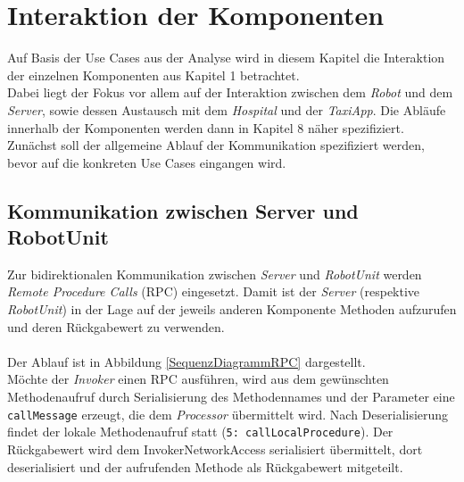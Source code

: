 \section{Interaktion der Komponenten}
Auf Basis der Use Cases aus der Analyse wird in diesem Kapitel die Interaktion der einzelnen Komponenten aus Kapitel 1 betrachtet. \\
Dabei liegt der Fokus vor allem auf der Interaktion zwischen dem \emph{Robot} und dem \emph{Server}, sowie dessen Austausch mit dem \emph{Hospital} und der \emph{TaxiApp}. 
Die Abläufe innerhalb der Komponenten werden dann in Kapitel 8 näher spezifiziert. \\
Zunächst soll der allgemeine Ablauf der Kommunikation spezifiziert werden, bevor auf die konkreten Use Cases eingangen wird.

\subsection*{Kommunikation zwischen Server und RobotUnit}
Zur bidirektionalen Kommunikation zwischen \emph{Server} und \emph{RobotUnit} werden \emph{Remote Procedure Calls} (RPC) eingesetzt. Damit ist der \emph{Server} (respektive \emph{RobotUnit}) in der Lage auf der jeweils anderen Komponente Methoden aufzurufen und deren Rückgabewert zu verwenden. \\ \\
Der Ablauf ist in Abbildung \ref{SequenzDiagrammRPC} dargestellt. \\ Möchte der \emph{Invoker} einen RPC ausführen, wird aus dem gewünschten Methodenaufruf durch Serialisierung des Methodennames und der Parameter eine \texttt{callMessage} erzeugt, die dem \emph{Processor} übermittelt wird. Nach Deserialisierung findet der lokale Methodenaufruf statt (\texttt{5: callLocalProcedure}). Der Rückgabewert wird dem InvokerNetworkAccess serialisiert übermittelt, dort deserialisiert und der aufrufenden Methode als Rückgabewert mitgeteilt.
